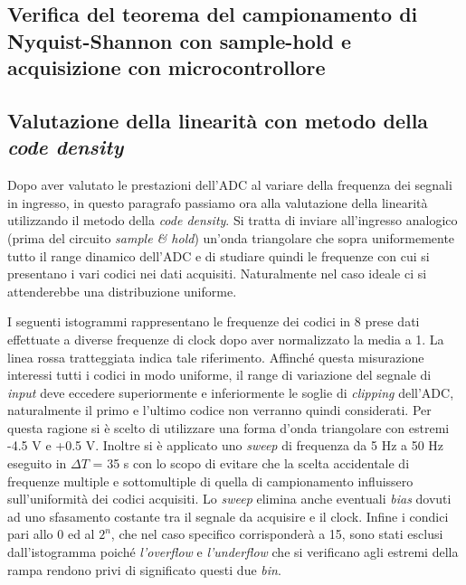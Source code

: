 \documentclass[journal]{IEEEtran}
\begin{document}
\subsection{Verifica del teorema del campionamento di Nyquist-Shannon con sample-hold e acquisizione con microcontrollore}



\subsection{Valutazione della linearità con metodo della \textit{code density}}
Dopo aver valutato le prestazioni dell'ADC al variare della frequenza dei segnali in ingresso, in questo paragrafo passiamo ora alla valutazione della linearità utilizzando il metodo della \textit{code density}. Si tratta di inviare all'ingresso analogico (prima del circuito \textit{sample \& hold}) un'onda triangolare che sopra uniformemente tutto il range dinamico dell'ADC e di studiare quindi le frequenze con cui si presentano i vari codici nei dati acquisiti. Naturalmente nel caso ideale ci si attenderebbe una distribuzione uniforme.

I seguenti istogrammi rappresentano le frequenze dei codici in 8 prese dati effettuate a diverse frequenze di clock dopo aver normalizzato la media a 1. La linea rossa tratteggiata indica tale riferimento.
Affinché questa misurazione interessi tutti i codici in modo uniforme, il range di variazione del segnale di \textit{input} deve eccedere superiormente e inferiormente le soglie di \textit{clipping} dell'ADC, naturalmente il primo e l'ultimo codice non verranno quindi considerati. Per questa ragione si è scelto di utilizzare una forma d'onda triangolare con estremi -4.5 V e +0.5 V. Inoltre si è applicato uno \textit{sweep} di frequenza da 5 Hz a 50 Hz eseguito in $\Delta T$ = 35 s
con lo scopo di evitare che la scelta accidentale di frequenze multiple e sottomultiple di quella di campionamento influissero sull'uniformità dei codici acquisiti. Lo \textit{sweep} elimina anche eventuali \textit{bias} dovuti ad uno sfasamento costante tra il segnale da acquisire e il clock.
Infine i condici pari allo 0 ed al $2^n$, che nel caso specifico corrisponderà a 15, sono stati esclusi dall'istogramma poiché \textit{l'overflow} e \textit{l'underflow} che si verificano agli estremi della rampa rendono privi di significato questi due \textit{bin}.
\end{document}
